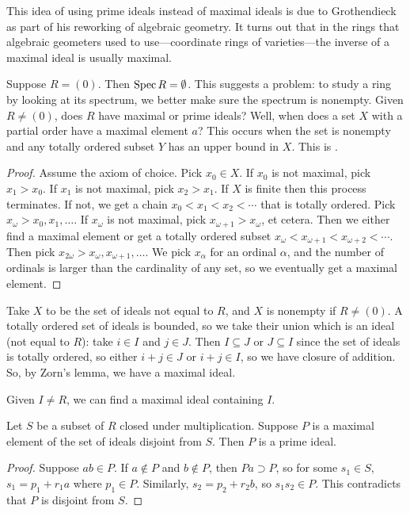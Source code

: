 \documentclass[11pt, oneside,margin=1in]{article}
\begin{document}
This idea of using prime ideals instead of maximal ideals is due to Grothendieck as part of his reworking of algebraic geometry. It turns out that in the rings that algebraic geometers used to use---coordinate rings of varieties---the inverse of a maximal ideal is usually maximal. 

Suppose $R=(0)$. Then $\operatorname{Spec} R = \emptyset$. This suggests a problem: to study a ring by looking at its spectrum, we better make sure the spectrum is nonempty. Given $R\ne(0)$, does $R$ have maximal or prime ideals? Well, when does a set $X$ with a partial order have a maximal element $a$? This occurs when the set is nonempty and any totally ordered subset $Y$ has an upper bound in $X$. This is .
\begin{proof}
Assume the axiom of choice. Pick $x_0\in X$. If $x_0$ is not maximal, pick $x_1>x_0$. If $x_1$ is not maximal, pick $x_2>x_1$. If $X$ is finite then this process terminates. If not, we get a chain $x_0<x_1<x_2<\cdots$ that is totally ordered. Pick $x_\omega > x_0,x_1,\hdots$. If $x_\omega$ is not maximal, pick $x_{\omega+1} > x_\omega$, et cetera. Then we either find a maximal element or get a totally ordered subset $x_\omega < x_{\omega+1} <x_{\omega+2}<\cdots$. Then pick $x_{2\omega} > x_\omega, x_{\omega+1},\hdots$. We pick $x_\alpha$ for an ordinal $\alpha$, and the number of ordinals is larger than the cardinality of any set, so we eventually get a maximal element.
\end{proof}

Take $X$ to be the set of ideals not equal to $R$, and $X$ is nonempty if $R\ne (0)$. A totally ordered set of ideals is bounded, so we take their union which is an ideal (not equal to $R$): take $i\in I$ and $j\in J$. Then $I\subseteq J$ or $J\subseteq I$ since the set of ideals is totally ordered, so either $i+ j\in J$ or $i+j\in I$, so we have closure of addition. So, by Zorn's lemma, we have a maximal ideal.

Given $I\ne R$, we can find a maximal ideal containing $I$. 

Let $S$ be a subset of $R$ closed under multiplication. Suppose $P$ is a maximal element of the set of ideals disjoint from $S$. Then $P$ is a prime ideal.
\begin{proof}
Suppose $ab\in P$. If $a\notin P$ and $b\notin P$, then $Pa\supset P$, so for some $s_1\in S$, $s_1=p_1+r_1a$ where $p_1\in P$. Similarly, $s_2=p_2+r_2b$, so $s_1s_2\in P$. This contradicts that $P$ is disjoint from $S$.
\end{proof}
\end{document}
